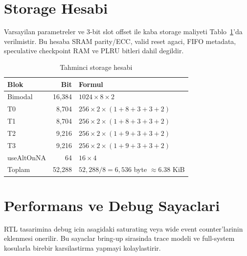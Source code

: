 \documentclass[11pt,a4paper]{article}
\begin{document}
\section{Storage Hesabi}

Varsayilan parametreler ve 3-bit slot offset ile kaba storage maliyeti
Tablo~\ref{tab:storage}'da verilmistir. Bu hesaba SRAM parity/ECC, valid reset
agaci, FIFO metadata, speculative checkpoint RAM ve PLRU bitleri dahil
degildir.

\begin{table}[!htbp]
\centering
\caption{Tahminci storage hesabi}
\label{tab:storage}
\small
\begin{tabular}{lrl}
\toprule
Blok & Bit & Formul \\
\midrule
Bimodal & 16,384 & $1024 \times 8 \times 2$ \\
T0 & 8,704 & $256 \times 2 \times (1+8+3+3+2)$ \\
T1 & 8,704 & $256 \times 2 \times (1+8+3+3+2)$ \\
T2 & 9,216 & $256 \times 2 \times (1+9+3+3+2)$ \\
T3 & 9,216 & $256 \times 2 \times (1+9+3+3+2)$ \\
useAltOnNA & 64 & $16 \times 4$ \\
\midrule
Toplam & 52,288 & $52,288/8 = 6,536$ byte $\approx 6.38$ KiB \\
\bottomrule
\end{tabular}
\end{table}

\section{Performans ve Debug Sayaclari}

RTL tasarimina debug icin asagidaki saturating veya wide event counter'larinin
eklenmesi onerilir. Bu sayaclar bring-up sirasinda trace modeli ve
full-system kosularla birebir karsilastirma yapmayi kolaylastirir.
\end{document}
